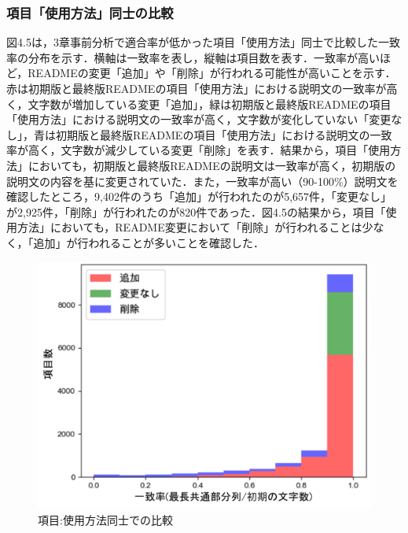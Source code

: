 \documentclass[submit]{ipsj}
\begin{document}
\subsubsection{項目「使用方法」同士の比較}
図4.5は，3章事前分析で適合率が低かった項目「使用方法」同士で比較した一致率の分布を示す．横軸は一致率を表し，縦軸は項目数を表す．一致率が高いほど，READMEの変更「追加」や「削除」が行われる可能性が高いことを示す．赤は初期版と最終版READMEの項目「使用方法」における説明文の一致率が高く，文字数が増加している変更「追加」，緑は初期版と最終版READMEの項目「使用方法」における説明文の一致率が高く，文字数が変化していない「変更なし」，青は初期版と最終版READMEの項目「使用方法」における説明文の一致率が高く，文字数が減少している変更「削除」を表す．結果から，項目「使用方法」においても，初期版と最終版READMEの説明文は一致率が高く，初期版の説明文の内容を基に変更されていた．また，一致率が高い（90-100\%）説明文を確認したところ，9,402件のうち「追加」が行われたのが5,657件，「変更なし」が2,925件，「削除」が行われたのが820件であった．図4.5の結果から，項目「使用方法」においても，README変更において「削除」が行われることは少なく，「追加」が行われることが多いことを確認した．


\begin{figure}[t]
 	\centering
		\includegraphics[width=1.0\linewidth]{./IPSJ202303_Ishioka/head_usag_equall2.pdf}
	\caption{項目:使用方法同士での比較}
	\label{fig:oss_developments}
\end{figure}
\end{document}
